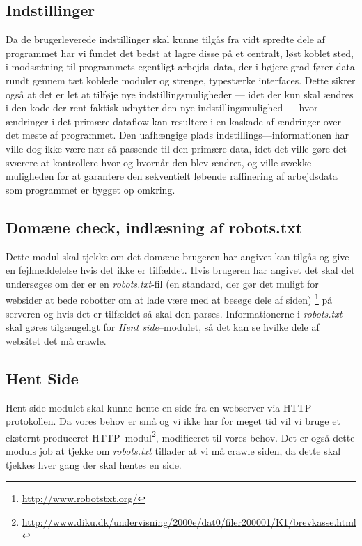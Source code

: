\documentclass[a4paper,oneside,article]{memoir}
\begin{document}
\subsection{Indstillinger}
Da de brugerleverede indstillinger skal kunne tilgås fra vidt spredte
dele af programmet har vi fundet det bedst at lagre disse på et
centralt, løst koblet sted, i modsætning til programmets egentligt
arbejds--data, der i højere grad fører data rundt gennem tæt koblede
moduler og strenge, typestærke interfaces. Dette sikrer også at det er
let at tilføje nye indstillingsmuligheder --- idet der kun skal ændres
i den kode der rent faktisk udnytter den nye indstillingsmulighed ---
hvor ændringer i det primære dataflow kan resultere i en kaskade af
ændringer over det meste af programmet. Den uafhængige plads
indstillings---informationen har ville dog ikke være nær så passende
til den primære data, idet det ville gøre det sværere at kontrollere
hvor og hvornår den blev ændret, og ville svække muligheden for at
garantere den sekventielt løbende raffinering af arbejdsdata som
programmet er bygget op omkring.

\subsection{Domæne check, indlæsning af robots.txt}
Dette modul skal tjekke om det domæne brugeren har angivet kan tilgås
og give en fejlmeddelelse hvis det ikke er tilfældet. Hvis brugeren
har angivet det skal det undersøges om der er en
\textit{robots.txt}-fil (en standard, der gør det muligt for websider
at bede robotter om at lade være med at besøge dele af
siden) \footnote{\url{http://www.robotstxt.org/}} på serveren og hvis
det er tilfældet så skal den parses. Informationerne i
\textit{robots.txt} skal gøres tilgængeligt for \textit{Hent
  side}--modulet, så det kan se hvilke dele af websitet det må crawle.

\subsection{Hent Side}
Hent side modulet skal kunne hente en side fra en webserver via
HTTP--protokollen. Da vores behov er små og vi ikke har for meget tid
vil vi bruge et eksternt produceret
HTTP--modul\footnote{\url{http://www.diku.dk/undervisning/2000e/dat0/filer200001/K1/brevkasse.html}},
modificeret til vores behov. Det er også dette moduls job at tjekke om
\textit{robots.txt} tillader at vi må crawle siden, da dette skal
tjekkes hver gang der skal hentes en side.
\end{document}
